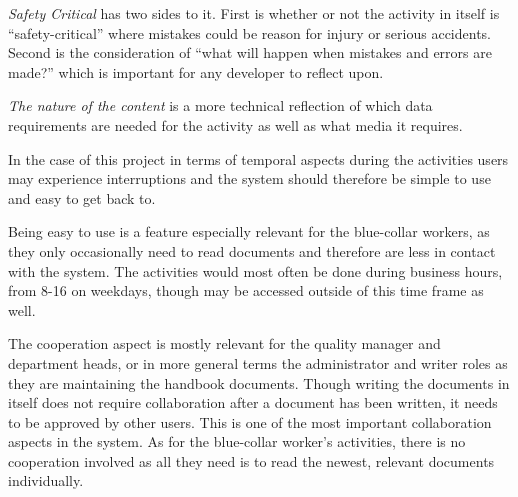 \textit{Safety Critical} has two sides to it.
First is whether or not the activity in itself is ``safety-critical'' where mistakes could be reason for injury or serious accidents.
Second is the consideration of ``what will happen when mistakes and errors are made?'' which is important for any developer to reflect upon.

\textit{The nature of the content} is a more technical reflection of which data requirements are needed for the activity as well as what media it requires.


In the case of this project in terms of temporal aspects during the activities users may experience interruptions and the system should therefore be simple to use and easy to get back to.

Being easy to use is a feature especially relevant for the blue-collar workers, as they only occasionally need to read documents and therefore are less in contact with the system.
The activities would most often be done during business hours, from 8-16 on weekdays, though may be accessed outside of this time frame as well.

The cooperation aspect is mostly relevant for the  quality manager and department heads, or in more general terms the administrator and writer roles as they are maintaining the handbook documents.
Though writing the documents in itself does not require collaboration after a document has been written, it needs to be approved by other users.
This is one of the most important collaboration aspects in the system.
As for the blue-collar worker's activities, there is no cooperation involved as all they need is to read the newest, relevant documents individually.


